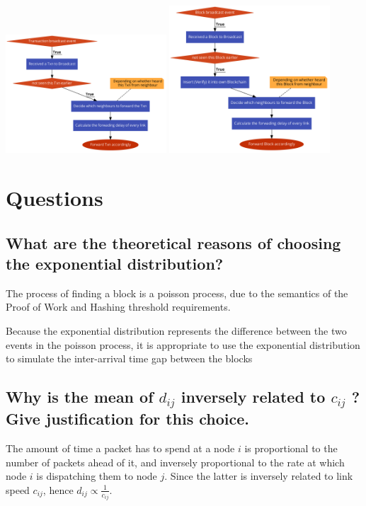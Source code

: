 \documentclass[a4paper,14pt]{article}
\begin{document}
\includegraphics[width=6cm]{TxnBroadcast.png}
\includegraphics[width=6cm]{BlockBroadcast.png}

\section{Questions}

\subsection{ What are the theoretical reasons of choosing the exponential distribution?}

The process of finding a block is a poisson process, due to the semantics of the Proof of Work and Hashing threshold requirements.

Because the exponential distribution represents the difference between the two events in the poisson process, it is appropriate to use the exponential distribution to simulate the inter-arrival time gap between the blocks

\subsection{ Why is the mean of $d_{ij}$ inversely related to $c_{ij}$ ? Give justification for this choice.}

The amount of time a packet has to spend at a node $i$ is proportional to the number of packets ahead of it, and inversely proportional to the rate at which node $i$ is dispatching them to node $j$.
Since the latter is inversely related to link speed $c_{ij}$, hence $d_{ij} \propto \frac{1}{c_{ij}}$.
\end{document}
